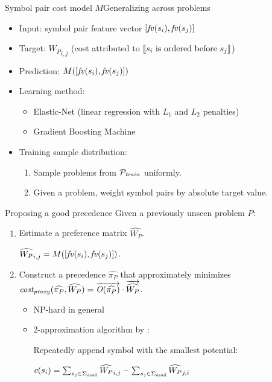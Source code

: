\documentclass[notes]{beamer}
\begin{document}
\begin{frame}{Symbol pair cost model $M$}{Generalizing across problems}
\begin{itemize}
	\item Input: symbol pair feature vector $[\mathit{fv}(s_i), \mathit{fv}(s_j)]$
	\item Target: ${W_P}_{i,j}$ (cost attributed to $\left \llbracket s_i\text{ is ordered before }s_j \right \rrbracket$)
	\item Prediction: $M([\mathit{fv}(s_i), \mathit{fv}(s_j)])$
	\item Learning method:
	\begin{itemize}
		\item Elastic-Net (linear regression with $L_1$ and $L_2$ penalties)
		\item Gradient Boosting Machine
	\end{itemize}
	\item Training sample distribution:
	\begin{enumerate}
		\item Sample problems from $\mathcal{P}_{\mathit{train}}$ uniformly.
		\item Given a problem, weight symbol pairs by absolute target value.
	\end{enumerate}
\end{itemize}
\end{frame}

\begin{frame}{Proposing a good precedence}
Given a previously unseen problem $P$:
\begin{enumerate}
	\item Estimate a preference matrix $\widehat{W_P}$.
	
	$\widehat{W_P}_{i,j} = M([\mathit{fv}(s_i), \mathit{fv}(s_j)])$.
	\item Construct a precedence \(\widehat{\pi_P}\) that approximately minimizes
	$\operatorname{\mathit{cost_{proxy}}}(\widehat{\pi_P}, \widehat{W_P}) = \overrightarrow{\operatorname{\mathit{O}}(\widehat{\pi_P})} \cdot \overrightarrow{\widehat{W_P}}$.
	\begin{itemize}
		\item NP-hard in general
		\item 2-approximation algorithm by \citet{Cohen2011}:
		
		Repeatedly append symbol with the smallest potential:
		
		$c(s_i) = \sum_{s_j \in \operatorname{\Sigma}_{\mathit{avail}}} \widehat{W_P}_{i, j} - \sum_{s_j \in \operatorname{\Sigma}_{\mathit{avail}}} \widehat{W_P}_{j, i}$
	\end{itemize}
\end{enumerate}
\end{frame}
\end{document}
